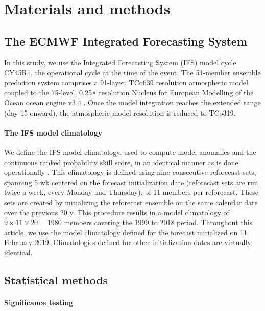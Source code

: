 \section{Materials and methods}

  \subsection*{The ECMWF Integrated Forecasting System}

    In this study, we use the Integrated Forecasting System (IFS) model cycle CY45R1, the operational cycle at the time of the event. The 51-member ensemble prediction system comprises a 91-layer, TCo639 resolution atmospheric model coupled to the 75-level, 0.25∘ resolution Nucleus for European Modelling of the Ocean ocean engine v3.4 \citep{ecmwf_ifs_2018}. Once the model integration reaches the extended range (day 15 onward), the atmospheric model resolution is reduced to TCo319.


    \paragraph{The IFS model climatology}

      We define the IFS model climatology, used to compute model anomalies and the continuous ranked probability skill score, in an identical manner as is done operationally \citep[for example, to calculate the Extreme Forecast Index product][]{ecmwf_ecmwf_2018}. This climatology is defined using nine consecutive reforecast sets, spanning 5 wk centered on the forecast initialization date (reforecast sets are run twice a week, every Monday and Thursday), of 11 members per reforecast. These sets are created by initializing the reforecast ensemble on the same calendar date over the previous 20 y. This procedure results in a model climatology of $9\times11\times20=1980$ members covering the 1999 to 2018 period. Throughout this article, we use the model climatology defined for the forecast initialized on 11 February 2019. Climatologies defined for other initialization dates are virtually identical.

  \subsection*{Statistical methods}

    \paragraph{Significance testing}

